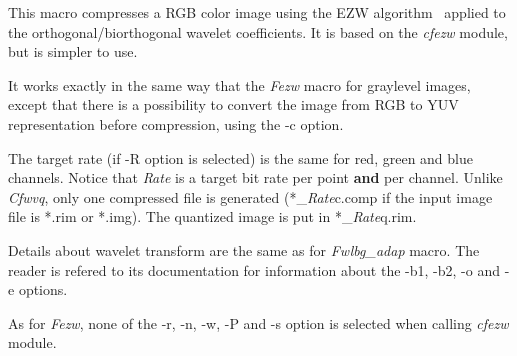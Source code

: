 This macro compresses a RGB color image using the EZW
algorithm~\cite{shapiro:embedded} applied to the orthogonal/biorthogonal 
wavelet coefficients. 
It is based on the {\em cfezw} module, but is simpler to use. 

It works exactly in the same way that the {\em Fezw} macro for graylevel 
images, except that there is a possibility to convert the image from 
RGB to YUV representation before compression, using the -c option. 

The target rate (if -R option is selected) is the same for red, green and 
blue channels. Notice that {\em Rate} is a target bit rate per point {\bf and} 
per channel. Unlike {\em Cfwvq}, only one compressed file is generated 
(*\_{\em Rate}c.comp if the input image file is *.rim or *.img). 
The quantized image is put in *\_{\em Rate}q.rim. 

Details about wavelet transform are the same as for {\em Fwlbg\_adap} macro. 
The reader is refered to its documentation for information about the -b1, -b2, 
-o and -e options. 

As for {\em Fezw}, none of the -r, -n, -w, -P and -s option is 
selected when calling {\em cfezw} module. 
